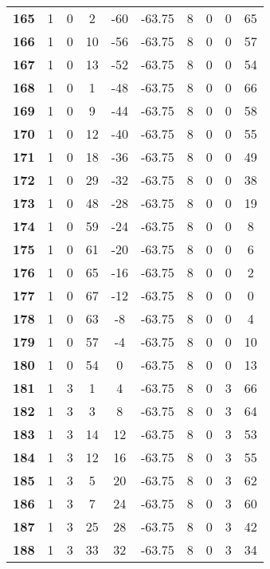\documentclass{article}%
\begin{document}
\begin{longtable}{cccccccccc}
        \textbf{165} & 1 & 0 & 2 & -60 & -63.75 & 8 & 0 & 0 & 65 \\ 
        \textbf{166} & 1 & 0 & 10 & -56 & -63.75 & 8 & 0 & 0 & 57 \\ 
        \textbf{167} & 1 & 0 & 13 & -52 & -63.75 & 8 & 0 & 0 & 54 \\ 
        \textbf{168} & 1 & 0 & 1 & -48 & -63.75 & 8 & 0 & 0 & 66 \\ 
        \textbf{169} & 1 & 0 & 9 & -44 & -63.75 & 8 & 0 & 0 & 58 \\ 
        \textbf{170} & 1 & 0 & 12 & -40 & -63.75 & 8 & 0 & 0 & 55 \\ 
        \textbf{171} & 1 & 0 & 18 & -36 & -63.75 & 8 & 0 & 0 & 49 \\ 
        \textbf{172} & 1 & 0 & 29 & -32 & -63.75 & 8 & 0 & 0 & 38 \\ 
        \textbf{173} & 1 & 0 & 48 & -28 & -63.75 & 8 & 0 & 0 & 19 \\ 
        \textbf{174} & 1 & 0 & 59 & -24 & -63.75 & 8 & 0 & 0 & 8 \\ 
        \textbf{175} & 1 & 0 & 61 & -20 & -63.75 & 8 & 0 & 0 & 6 \\ 
        \textbf{176} & 1 & 0 & 65 & -16 & -63.75 & 8 & 0 & 0 & 2 \\ 
        \textbf{177} & 1 & 0 & 67 & -12 & -63.75 & 8 & 0 & 0 & 0 \\ 
        \textbf{178} & 1 & 0 & 63 & -8 & -63.75 & 8 & 0 & 0 & 4 \\ 
        \textbf{179} & 1 & 0 & 57 & -4 & -63.75 & 8 & 0 & 0 & 10 \\ 
        \textbf{180} & 1 & 0 & 54 & 0 & -63.75 & 8 & 0 & 0 & 13 \\ 
        \textbf{181} & 1 & 3 & 1 & 4 & -63.75 & 8 & 0 & 3 & 66 \\ 
        \textbf{182} & 1 & 3 & 3 & 8 & -63.75 & 8 & 0 & 3 & 64 \\ 
        \textbf{183} & 1 & 3 & 14 & 12 & -63.75 & 8 & 0 & 3 & 53 \\ 
        \textbf{184} & 1 & 3 & 12 & 16 & -63.75 & 8 & 0 & 3 & 55 \\ 
        \textbf{185} & 1 & 3 & 5 & 20 & -63.75 & 8 & 0 & 3 & 62 \\ 
        \textbf{186} & 1 & 3 & 7 & 24 & -63.75 & 8 & 0 & 3 & 60 \\ 
        \textbf{187} & 1 & 3 & 25 & 28 & -63.75 & 8 & 0 & 3 & 42 \\ 
        \textbf{188} & 1 & 3 & 33 & 32 & -63.75 & 8 & 0 & 3 & 34 \\ 

\end{longtable}
\end{document}
